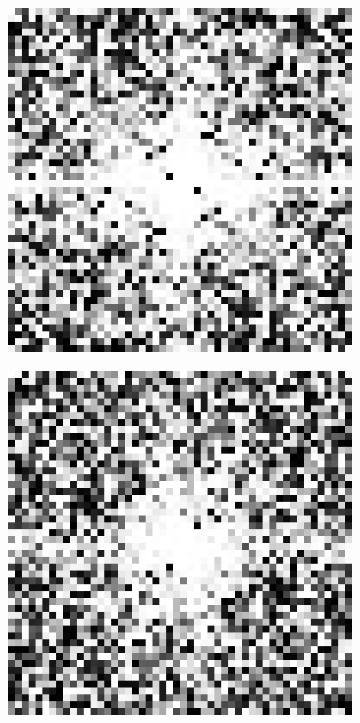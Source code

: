 \begin{figure}[htpb]
\begin{subfigure}{.25\textwidth}
\end{subfigure}%
\begin{subfigure}{.25\textwidth}
\includegraphics[width=1\textwidth]{img/noiselessCPPsigma150}
\end{subfigure}%
\begin{subfigure}{.25\textwidth}
\includegraphics[width=1\textwidth]{img/noiselessCPPsigma300}

\end{subfigure}
\end{figure}

